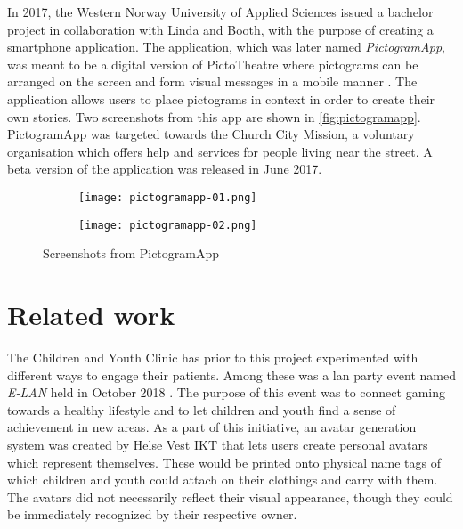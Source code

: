 In 2017, the Western Norway University of Applied Sciences issued a bachelor project in collaboration with Linda and Booth, with the purpose of creating a smartphone application. The application, which was later named \emph{PictogramApp}, was meant to be a digital version of PictoTheatre where pictograms can be arranged on the screen and form visual messages in a mobile manner \parencite{fure2017}. The application allows users to place pictograms in context in order to create their own stories. Two screenshots from this app are shown in \autoref{fig:pictogramapp}. PictogramApp was targeted towards the Church City Mission, a voluntary organisation which offers help and services for people living near the street. A beta version of the application was released in June 2017.

\begin{figure}
    \centering
    \begin{subfigure}{0.4\textwidth}
        \centering
        \texttt{[image: pictogramapp-01.png]}
        \label{fig:pictogramapp-list}
    \end{subfigure}
    \hspace{0.05\textwidth}
    \begin{subfigure}{0.4\textwidth}
        \centering
        \texttt{[image: pictogramapp-02.png]}
        \label{fig:pictogramapp-scene}
    \end{subfigure}
    \caption{Screenshots from PictogramApp}
    \label{fig:pictogramapp}
\end{figure}

\section{Related work}
\label{sec:relatedwork}

The Children and Youth Clinic has prior to this project experimented with different ways to engage their patients. Among these was a lan party event named \emph{E-LAN} held in October 2018 \parencite{helsebergen2018}. The purpose of this event was to connect gaming towards a healthy lifestyle and to let children and youth find a sense of achievement in new areas. As a part of this initiative, an avatar generation system was created by Helse Vest IKT that lets users create personal avatars which represent themselves. These would be printed onto physical name tags of which children and youth could attach on their clothings and carry with them. The avatars did not necessarily reflect their visual appearance, though they could be immediately recognized by their respective owner.

